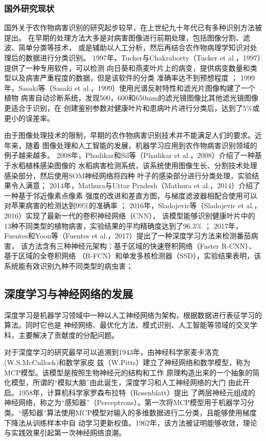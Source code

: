   \subsubsection{\hei\sihao\textbf{国外研究现状}}
    国外关于农作物病害识别的研究起步较早，在上世纪九十年代已有多种识别方法被提出。
    在早期的处理方法大多是对病害图像进行前期处理，包括图像分割、滤波、简单分类等技术，
    或是辅助以人工分析，然后再结合农作物病理学知识对处理后的数据进行分类识别。
    1997年，Tucker与Chakraborty（Tucker et al.，1997）提供了一种专用软件，可以检测
    向日葵和燕麦叶片上的病变，提供病变数量和类型以及病害严重程度的数据，但是该软件的分类
    准确率达不到预想程度 \cite{tucker1997quantitative}；
    1999年，Sasaki等（Sasaki et al.，1999）使用光谱反射特性和滤光片图像构建了一个植物
    病害自动诊断系统，发现500，600和650mm的滤光镜图像比其他滤光镜图像更适合于识别，在
    创建鉴别参数对健康叶片和患病叶片进行分类后，达到了5\%或更小的误差率\cite{sasaki1999automatic}。

    由于图像处理技术的限制，早期的农作物病害识别技术并不能满足人们的要求。近年来，随着
    图像处理和人工智能的发展，机器学习应用到农作物病害识别领域的例子越来越多。
    2008年，Phadikar和Sil等（Phadikar et al.，2008）介绍了一种基于水稻植株感染图像的
    水稻病害检测系统，该系统使用图像生长、分割技术处理感染部分，然后使用SOM神经网络将四种
    叶子的感染部分进行分类处理，实验结果令人满意\cite{phadikar2008rice}；
    2014年，Mathura与Uttar Pradesh（Mathura et al.，2014）介绍了一种基于邻近像素点像素
    强度的改进和差直方图，与梯度滤波器相配合使用可以对苹果病害的检测达到99\%的准确率 \cite{dubey2014fruit}；
    2016年，Sladojevic等（Sladojevic et al.，2016）实现了最新一代的卷积神经网络（CNN），
    该模型能够识别健康叶片中的13种不同类型的植物病害，实验结果的平均精确度达到了96.3\% \cite{sladojevic2016deep}；
    2017年，Fuentes和Yoon等（Fuentes et al.，2017）提出了一种深度学习方法来检测番茄病害，
    该方法含有三种神经元架构：基于区域的快速卷积网络（Faster R-CNN）、基于区域的全卷积网络
    （R-FCN）和单发多核检测器（SSD），实验结果表明，该系统能有效识别九种不同类型的病虫害\cite{fuentes2017robust}；

  \subsection{\hei\xiaosan\textbf{深度学习与神经网络的发展}}
  深度学习是机器学习领域中一种以人工神经网络为架构，根据数据进行表征学习的算法。同时它也是
  神经网络、最优化方法、模式识别、人工智能等领域的交叉学科，主要解决了贡献度的分配问题。

  对于深度学习的研究最早可以追溯到1943年，由神经科学家麦卡洛克(W.S.McCulloch)和数学家皮
  兹（W.Pitts）建立了神经网络和数学模型，称为MCP模型。该模型是按照生物神经元的结构和工作
  原理构造出来的一个抽象的简化模型，所谓的“模拟大脑”由此诞生，深度学习和人工神经网络的大门
  由此开启\cite{mcculloch1990logical}。1958年，计算机科学家罗森布拉特（Rosenblatt）提出
  了两层神经元组成的神经网络，称之为“感知器”（Perceptrons）。第一次将MCP模型用于机器学习分
  类。“感知器”算法使用MCP模型对输入的多维数据进行二分类，且能够使用梯度下降法从训练样本中自
  动学习更新权值。1962年，该方法被证明能够收敛，理论与实践效果引起第一次神经网络浪潮。

